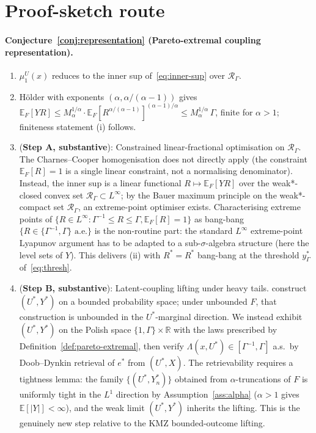 \documentclass[11pt]{article}
\newcommand{\E}{\mathbb{E}}
\newcommand{\R}{\mathbb{R}}
\theoremstyle{definition}
\theoremstyle{plain}
\theoremstyle{remark}
\begin{document}
\section{Proof-sketch route}

\paragraph{Conjecture~\ref{conj:representation} (Pareto-extremal coupling representation).}
\begin{enumerate}[label=(\arabic*)]
  \item[$\leftarrow$] [\emph{unfold \S6 defs}] $\mu_1^U(x)$ reduces to the inner sup of~\eqref{eq:inner-sup} over $\mathcal{R}_\Gamma$.
  \item[$\leftarrow$] [\emph{substitute Assumption~\ref{ass:alpha}}] H\"older with exponents $(\alpha, \alpha/(\alpha-1))$ gives $\E_F[Y R] \le M_\alpha^{1/\alpha} \cdot \E_F[R^{\alpha/(\alpha-1)}]^{(\alpha-1)/\alpha} \le M_\alpha^{1/\alpha}\,\Gamma$, finite for $\alpha > 1$; finiteness statement (i) follows.
  \item[$\leftarrow$] (\textbf{Step A, substantive}): Constrained linear-fractional optimisation on $\mathcal{R}_\Gamma$. The Charnes--Cooper homogenisation does not directly apply (the constraint $\E_F[R] = 1$ is a single linear constraint, not a normalising denominator). Instead, the inner sup is a linear functional $R \mapsto \E_F[YR]$ over the weak*-closed convex set $\mathcal{R}_\Gamma \subset L^\infty$; by the Bauer maximum principle on the weak*-compact set $\mathcal{R}_\Gamma$, an extreme-point optimiser exists. Characterising extreme points of $\{R \in L^\infty: \Gamma^{-1} \le R \le \Gamma, \E_F[R] = 1\}$ as bang-bang $\{R \in \{\Gamma^{-1}, \Gamma\} \text{ a.e.}\}$ is the non-routine part: the standard $L^\infty$ extreme-point Lyapunov argument has to be adapted to a sub-$\sigma$-algebra structure (here the level sets of $Y$). This delivers (ii) with $R^* = R^*$ bang-bang at the threshold $y_\Gamma^*$ of~\eqref{eq:thresh}.
  \item[$\leftarrow$] (\textbf{Step B, substantive}): Latent-coupling lifting under heavy tails. \citet{KallusMaoZhou2019} construct $(U^*, Y^*)$ on a bounded probability space; under unbounded $F$, that construction is unbounded in the $U^*$-marginal direction. We instead exhibit $(U^*, Y^*)$ on the Polish space $\{1, \Gamma\} \times \R$ with the laws prescribed by Definition~\ref{def:pareto-extremal}, then verify $\Lambda(x, U^*) \in [\Gamma^{-1}, \Gamma]$ a.s.\ by Doob--Dynkin retrieval of $e^*$ from $(U^*, X)$. The retrievability requires a tightness lemma: the family $\{(U^*, Y^*_n)\}$ obtained from $\alpha$-truncations of $F$ is uniformly tight in the $L^1$ direction by Assumption~\ref{ass:alpha} ($\alpha > 1$ gives $\E[|Y|] < \infty$), and the weak limit $(U^*, Y^*)$ inherits the lifting. This is the genuinely new step relative to the KMZ bounded-outcome lifting.

\end{enumerate}
\end{document}
